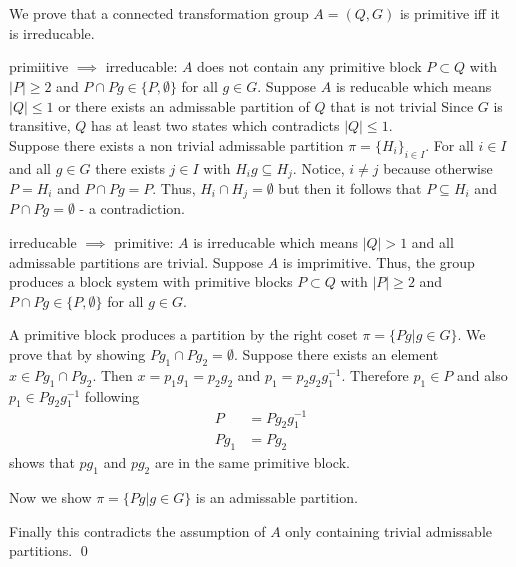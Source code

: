 \documentclass[a4paper,12pt,numbers=noenddot]{scrreport}
\begin{document}

\chapter{}
\section{}
We prove that a connected transformation group $A=(Q,G)$ is primitive iff it is irreducable.

primiitive $\implies$ irreducable: $A$ does not contain any primitive block $P \subset Q$ with $|P| \geq 2$
and $P \cap Pg \in \{P, \emptyset \}$ for all $g \in G$.
Suppose $A$ is reducable which means $|Q| \leq 1$ or there exists an admissable partition of $Q$ that is not trivial
Since $G$ is transitive, $Q$ has at least two states which contradicts $|Q| \leq 1$.\\
Suppose there exists a non trivial admissable partition $\pi = \{H_i\}_{i \in I}$.
For all $i \in I$ and all $g \in G$ there exists $j \in I$ with $H_ig \subseteq H_j$.
Notice, $i \neq j$ because otherwise $P = H_i$ and $P \cap Pg = P$.
Thus, $H_i \cap H_j = \emptyset$ but then it follows that $P \subseteq H_i$ and $P \cap Pg = \emptyset$ - a contradiction.

irreducable $\implies$ primitive: $A$ is irreducable which means $|Q| > 1$ and all admissable partitions are trivial.
Suppose $A$ is imprimitive.
Thus, the group produces a block system with primitive blocks $P \subset Q$ with $|P| \geq 2$ and $P \cap Pg \in \{P, \emptyset\}$ for all $g \in G$.

A primitive block produces a partition by the right coset  $\pi = \{Pg | g \in G\}$.
We prove that by showing $Pg_1 \cap Pg_2 = \emptyset$.
Suppose there exists an element $x \in Pg_1 \cap Pg_2$.
Then $x = p_1g_1 = p_2g_2$ and $p_1 = p_2g_2g^{-1}_1$. 
Therefore $p_1 \in P$ and also $p_1 \in Pg_2g^{-1}_1$ following 
\begin{align*}
    P &= Pg_2g^{-1}_1\\
    Pg_1 &= Pg_2
\end{align*}
shows that $pg_1$ and $pg_2$ are in the same primitive block.

Now we show $\pi = \{ Pg | g \in G\}$ is an admissable partition.

Finally this contradicts the assumption of $A$ only containing trivial admissable partitions.
\qed

\section{}
\section{}
\section{}
\end{document}
